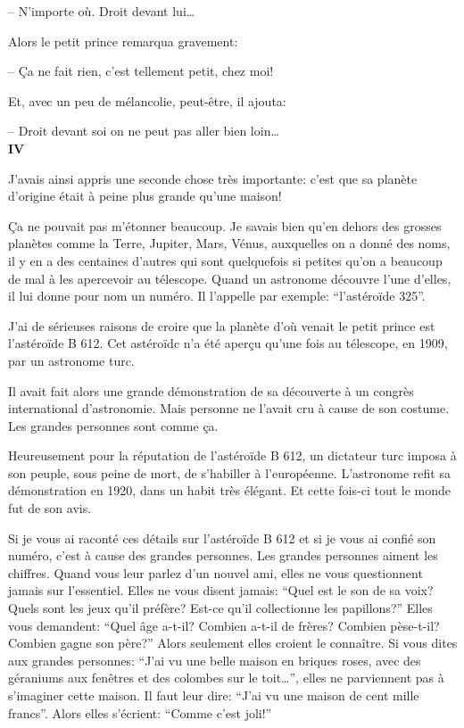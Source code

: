 \begin{Parallel}[p]{}{}
{-- N'importe où. Droit devant lui\ldots{}

Alors le petit prince remarqua gravement:

-- Ça ne fait rien, c'est tellement petit, chez moi!

Et, avec un peu de mélancolie, peut-être, il
ajouta:

-- Droit devant soi on ne peut pas aller bien loin\ldots{}\\

\textbf{IV}

J'avais ainsi appris une seconde chose très importante: c'est que sa planète d'origine était à peine
plus grande qu'une maison!

Ça ne pouvait pas m'étonner beaucoup. Je savais
bien qu'en dehors des grosses planètes comme la
Terre, Jupiter, Mars, Vénus, auxquelles on a donné des
noms, il y en a des centaines d'autres
qui sont quelquefois si petites qu'on a
beaucoup de mal à les apercevoir au télescope. Quand
un astronome découvre l'une d'elles, il lui donne pour
nom un numéro. Il l'appelle par exemple: ``l'astéroïde 325''.

J'ai de sérieuses raisons de croire que la planète d'où venait le petit prince est l'astéroïde B 612.
Cet astéroïdc n'a été aperçu qu'une fois au télescope, en 1909, par un astronome turc.

Il avait fait alors une grande
démonstration de sa découverte à un
congrès international d'astronomie. Mais personne
ne l'avait cru à cause de son costume. Les grandes
personnes sont comme ça.

Heureusement pour la réputation de l'astéroïde B 612, un dictateur turc imposa à son peuple, sous
peine de mort, de s'habiller à l'européenne. L'astronome refit sa démonstration en 1920, dans un habit
très élégant. Et cette fois-ci tout le monde fut de son avis.

Si je vous ai raconté ces détails sur l'astéroïde B 612 et si je vous ai confié son numéro, c'est
à cause des grandes personnes. Les grandes personnes aiment les chiffres. Quand vous leur parlez
d'un nouvel ami, elles ne vous questionnent jamais
sur l'essentiel. Elles ne vous disent jamais: ``Quel
est le son de sa voix? Quels sont les jeux qu'il préfère? Est-ce qu'il
collectionne les papillons?'' Elles vous demandent: ``Quel âge a-t-il? Combien a-t-il de frères? Combien pèse-t-il? Combien gagne son père?'' Alors seulement elles croient le connaître. Si
vous dites aux grandes personnes: ``J'ai vu une belle
maison en briques roses, avec des géraniums aux
fenêtres et des colombes sur le toit\ldots{}'', elles ne parviennent pas à s'imaginer cette maison. Il faut leur
dire: ``J'ai vu une maison de cent mille francs''.
Alors elles s'écrient: ``Comme c'est joli!''

}
\end{Parallel}
